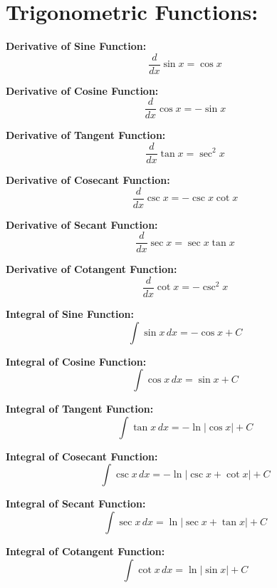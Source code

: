 \documentclass{article}
\begin{document}
\section*{\textbf{Trigonometric Functions:}}

\textbf{Derivative of Sine Function:}
\[
\frac{d}{dx} \sin x = \cos x
\]

\textbf{Derivative of Cosine Function:}
\[
\frac{d}{dx} \cos x = -\sin x
\]

\textbf{Derivative of Tangent Function:}
\[
\frac{d}{dx} \tan x = \sec^2 x
\]

\textbf{Derivative of Cosecant Function:}
\[
\frac{d}{dx} \csc x = -\csc x \cot x
\]

\textbf{Derivative of Secant Function:}
\[
\frac{d}{dx} \sec x = \sec x \tan x
\]

\textbf{Derivative of Cotangent Function:}
\[
\frac{d}{dx} \cot x = -\csc^2 x
\]

\textbf{Integral of Sine Function:}
\[
\int \sin x \, dx = -\cos x + C
\]

\textbf{Integral of Cosine Function:}
\[
\int \cos x \, dx = \sin x + C
\]

\textbf{Integral of Tangent Function:}
\[
\int \tan x \, dx = -\ln|\cos x| + C
\]

\textbf{Integral of Cosecant Function:}
\[
\int \csc x \, dx = -\ln|\csc x + \cot x| + C
\]

\textbf{Integral of Secant Function:}
\[
\int \sec x \, dx = \ln|\sec x + \tan x| + C
\]

\textbf{Integral of Cotangent Function:}
\[
\int \cot x \, dx = \ln|\sin x| + C
\]
\end{document}

